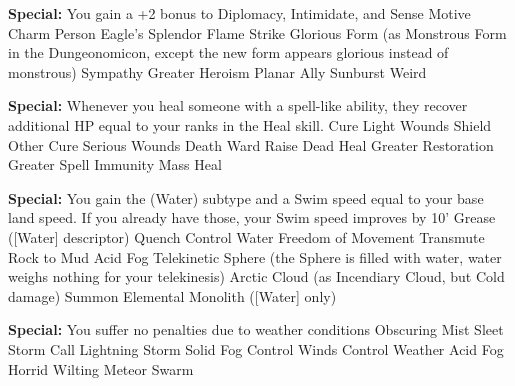 \begin{multicols}{2}
\textbf{Special: }{You gain a +2 bonus to Diplomacy, Intimidate, and Sense Motive}
\sphere
{Charm Person}
{Eagle's Splendor}
{Flame Strike}
{Glorious Form (as Monstrous Form in the Dungeonomicon, except the new form appears glorious instead of monstrous)}
{Sympathy}
{Greater Heroism}
{Planar Ally}
{Sunburst}
{Weird}

\textbf{Special: }{Whenever you heal someone with a spell-like ability, they recover additional HP equal to your ranks in the Heal skill.}
\sphere
{Cure Light Wounds}
{Shield Other}
{Cure Serious Wounds}
{Death Ward}
{Raise Dead}
{Heal}
{Greater Restoration}
{Greater Spell Immunity}
{Mass Heal}

\textbf{Special: }{You gain the (Water) subtype and a Swim speed equal to your base land speed. If you already have those, your Swim speed improves by 10'}
\sphere
{Grease ([Water] descriptor)}
{Quench}
{Control Water}
{Freedom of Movement}
{Transmute Rock to Mud}
{Acid Fog}
{Telekinetic Sphere (the Sphere is filled with water, water weighs nothing for your telekinesis)}
{Arctic Cloud (as Incendiary Cloud, but Cold damage)}
{Summon Elemental Monolith ([Water] only)}

\textbf{Special: }{You suffer no penalties due to weather conditions}
\sphere
{Obscuring Mist}
{Sleet Storm}
{Call Lightning Storm}
{Solid Fog}
{Control Winds}
{Control Weather}
{Acid Fog}
{Horrid Wilting}
{Meteor Swarm}








\end{multicols}